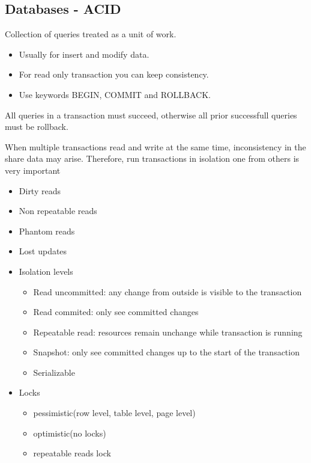 \documentclass[../main.tex]{subfiles}
\begin{document}
\subsection{Databases - ACID}
\begin{definition}[Transaction]
    Collection of queries treated as a unit of work.
    \begin{itemize}
        \item Usually for insert and modify data.
        \item For read only transaction you can keep consistency.
        \item Use keywords BEGIN, COMMIT and ROLLBACK.
    \end{itemize}
\end{definition}

\begin{definition}[Atomicity]
    All queries in a transaction must succeed, otherwise all prior successfull queries must be rollback.
\end{definition}

\begin{definition}[Isolation]
    When multiple transactions read and write at the same time, inconsistency in the share data may arise. Therefore, run transactions in isolation one from others is very important
    \begin{itemize}
        \item Dirty reads
        \item Non repeatable reads
        \item Phantom reads
        \item Lost updates
        \item Isolation levels
        \begin{itemize}
            \item Read uncommitted: any change from outside is visible to the transaction
            \item Read commited: only see committed changes
            \item Repeatable read: resources remain unchange while transaction is running
            \item Snapshot: only see committed changes up to the start of the transaction
            \item Serializable
        \end{itemize}
        \item Locks
        \begin{itemize}
            \item pessimistic(row level, table level, page level)
            \item optimistic(no locks)
            \item repeatable reads lock
        \end{itemize}
    \end{itemize}
\end{definition}
\end{document}
